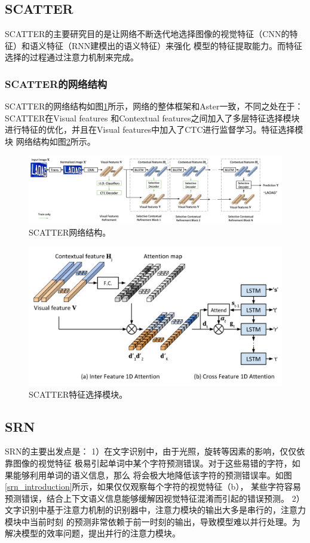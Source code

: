 \subsection{SCATTER}
SCATTER\cite{scatter}的主要研究目的是让网络不断迭代地选择图像的视觉特征（CNN的特征）和语义特征（RNN建模出的语义特征）来强化
模型的特征提取能力。而特征选择的过程通过注意力机制来完成。
\subsubsection{SCATTER的网络结构}
SCATTER的网络结构如图\ref{scatter_framework}所示，网络的整体框架和Aster一致，不同之处在于：SCATTER在Visual features
和Contextual features之间加入了多层特征选择模块进行特征的优化，并且在Visual features中加入了CTC进行监督学习。特征选择模块
网络结构如图\ref{scatter_feature_select}所示。
\begin{figure}[H]
    \centering
    \includegraphics[width=.98\textwidth]{figure/recognition/scatter_framework.png} 
    \caption{SCATTER网络结构。} 
    \label{scatter_framework} 
\end{figure}

\begin{figure}[H]
    \centering
    \includegraphics[width=.8\textwidth]{figure/recognition/scatter_feature_select.png} 
    \caption{SCATTER特征选择模块。} 
    \label{scatter_feature_select} 
\end{figure}

\subsection{SRN}
SRN的主要出发点是：
1）在文字识别中，由于光照，旋转等因素的影响，仅仅依靠图像的视觉特征
极易引起单词中某个字符预测错误。对于这些易错的字符，如果能够利用单词的语义信息，那么
将会极大地降低该字符的预测错误率。如图\ref{srn_introduction}所示，如果仅仅观察每个字符的视觉特征（b），
某些字符容易预测错误，结合上下文语义信息能够缓解因视觉特征混淆而引起的错误预测。
2）文字识别中基于注意力机制的识别器中\cite{shi2018aster}，注意力模块的输出大多是串行的，注意力模块中当前时刻
的预测非常依赖于前一时刻的输出，导致模型难以并行处理。为解决模型的效率问题，提出并行的注意力模块。


